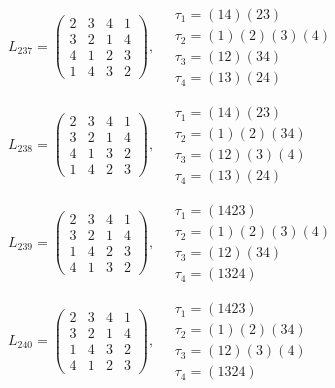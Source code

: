 $L_{237} = \begin{pmatrix} 2 & 3 & 4 & 1 \\ 3 & 2 & 1 & 4 \\ 4 & 1 & 2 & 3 \\ 1 & 4 & 3 & 2 \end{pmatrix}, \quad \begin{matrix} \tau_{1} = (1 4)(2 3) \\ \tau_{2} = (1)(2)(3)(4) \\ \tau_{3} = (1 2)(3 4) \\ \tau_{4} = (1 3)(2 4) \end{matrix}$

$L_{238} = \begin{pmatrix} 2 & 3 & 4 & 1 \\ 3 & 2 & 1 & 4 \\ 4 & 1 & 3 & 2 \\ 1 & 4 & 2 & 3 \end{pmatrix}, \quad \begin{matrix} \tau_{1} = (1 4)(2 3) \\ \tau_{2} = (1)(2)(3 4) \\ \tau_{3} = (1 2)(3)(4) \\ \tau_{4} = (1 3)(2 4) \end{matrix}$

$L_{239} = \begin{pmatrix} 2 & 3 & 4 & 1 \\ 3 & 2 & 1 & 4 \\ 1 & 4 & 2 & 3 \\ 4 & 1 & 3 & 2 \end{pmatrix}, \quad \begin{matrix} \tau_{1} = (1 4 2 3) \\ \tau_{2} = (1)(2)(3)(4) \\ \tau_{3} = (1 2)(3 4) \\ \tau_{4} = (1 3 2 4) \end{matrix}$

$L_{240} = \begin{pmatrix} 2 & 3 & 4 & 1 \\ 3 & 2 & 1 & 4 \\ 1 & 4 & 3 & 2 \\ 4 & 1 & 2 & 3 \end{pmatrix}, \quad \begin{matrix} \tau_{1} = (1 4 2 3) \\ \tau_{2} = (1)(2)(3 4) \\ \tau_{3} = (1 2)(3)(4) \\ \tau_{4} = (1 3 2 4) \end{matrix}$

